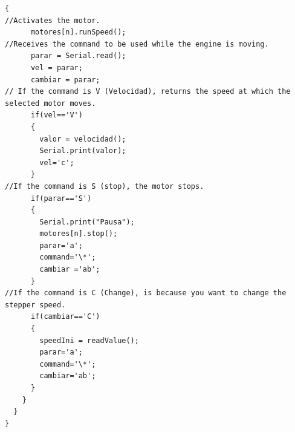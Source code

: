 \begin{lstlisting}[style=Arduino]
    {
//Activates the motor.
      motores[n].runSpeed();  
//Receives the command to be used while the engine is moving.    
      parar = Serial.read();  
      vel = parar; 
      cambiar = parar; 
// If the command is V (Velocidad), returns the speed at which the selected motor moves.       
      if(vel=='V') 
      {
        valor = velocidad();
        Serial.print(valor);
        vel='c';
      }
//If the command is S (stop), the motor stops.     
      if(parar=='S')  
      {
        Serial.print("Pausa");
        motores[n].stop();  
        parar='a';  
        command='\*'; 
        cambiar ='ab';
      }
//If the command is C (Change), is because you want to change the stepper speed.
      if(cambiar=='C')  
      {
        speedIni = readValue();
        parar='a';
        command='\*'; 
        cambiar='ab';
      }
    }
  }
}
\end{lstlisting}

